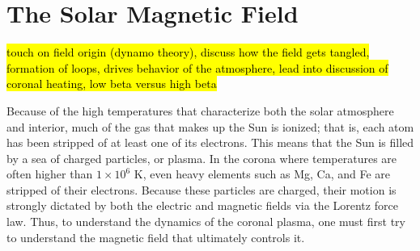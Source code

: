 \section{The Solar Magnetic Field}
\label{sec:magnetic_field}
\hl{touch on field origin (dynamo theory), discuss how the field gets tangled, formation of loops, drives behavior of the atmosphere, lead into discussion of coronal heating, low beta versus high beta}
%
\par Because of the high temperatures that characterize both the solar atmosphere and interior, much of the gas that makes up the Sun is ionized; that is, each atom has been stripped of at least one of its electrons. This means that the Sun is filled by a sea of charged particles, or plasma. In the corona where temperatures are often higher than $1\times10^6$ K, even heavy elements such as Mg, Ca, and Fe are stripped of their electrons. Because these particles are charged, their motion is strongly dictated by both the electric and magnetic fields via the Lorentz force law. Thus, to understand the dynamics of the coronal plasma, one must first try to understand the magnetic field that ultimately controls it.
%
